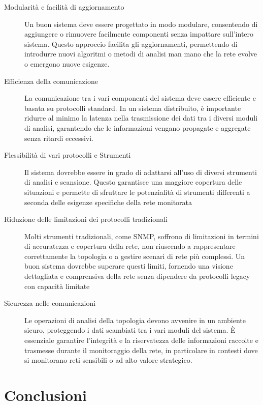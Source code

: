 \documentclass[target=bach,aauheader=,style=]{thud}
\begin{document}
\begin{description}
  \item[Modularità e facilità di aggiornamento]
  Un buon sistema deve essere progettato in modo modulare, consentendo di aggiungere o rimuovere facilmente componenti senza impattare sull'intero sistema. Questo approccio facilita gli aggiornamenti, permettendo di introdurre nuovi algoritmi o metodi di analisi man mano che la rete evolve o emergono nuove esigenze.

  \item[Efficienza della comunicazione]
  La comunicazione tra i vari componenti del sistema deve essere efficiente e basata su protocolli standard. In un sistema distribuito, è importante ridurre al minimo la latenza nella trasmissione dei dati tra i diversi moduli di analisi, garantendo che le informazioni vengano propagate e aggregate senza ritardi eccessivi.

\item[Flessibilità di vari protocolli e Strumenti]
    Il sistema dovrebbe essere in grado di adattarsi all'uso di diversi strumenti di analisi e scansione. Questo garantisce una maggiore copertura delle situazioni e permette di sfruttare le potenzialità di strumenti differenti a seconda delle esigenze specifiche della rete monitorata

  \item[Riduzione delle limitazioni dei protocolli tradizionali]
  Molti strumenti tradizionali, come SNMP, soffrono di limitazioni in termini di accuratezza e copertura della rete, non riuscendo a rappresentare correttamente la topologia o a gestire scenari di rete più complessi. Un buon sistema dovrebbe superare questi limiti, fornendo una visione dettagliata e comprensiva della rete senza dipendere da protocolli legacy con capacità limitate

  \item[Sicurezza nelle comunicazioni]
  Le operazioni di analisi della topologia devono avvenire in un ambiente sicuro, proteggendo i dati scambiati tra i vari moduli del sistema. È essenziale garantire l'integrità e la riservatezza delle informazioni raccolte e trasmesse durante il monitoraggio della rete, in particolare in contesti dove si monitorano reti sensibili o ad alto valore strategico.

\end{description}

\section{Conclusioni}
\end{document}

